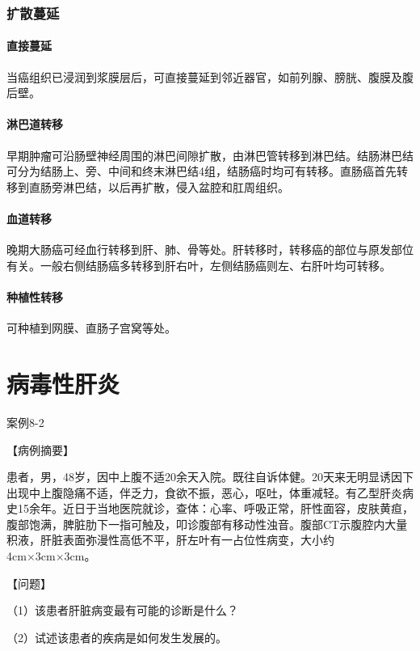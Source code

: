 \subsubsection{扩散蔓延}

\paragraph{直接蔓延}
当癌组织已浸润到浆膜层后，可直接蔓延到邻近器官，如前列腺、膀胱、腹膜及腹后壁。

\paragraph{淋巴道转移}
早期肿瘤可沿肠壁神经周围的淋巴间隙扩散，由淋巴管转移到淋巴结。结肠淋巴结可分为结肠上、旁、中间和终末淋巴结4组，结肠癌时均可有转移。直肠癌首先转移到直肠旁淋巴结，以后再扩散，侵入盆腔和肛周组织。

\paragraph{血道转移}
晚期大肠癌可经血行转移到肝、肺、骨等处。肝转移时，转移癌的部位与原发部位有关。一般右侧结肠癌多转移到肝右叶，左侧结肠癌则左、右肝叶均可转移。

\paragraph{种植性转移}
可种植到网膜、直肠子宫窝等处。

\section{病毒性肝炎}

\begin{framed}
{案例8-2}

{【病例摘要】}

患者，男，48岁，因中上腹不适20余天入院。既往自诉体健。20天来无明显诱因下出现中上腹隐痛不适，伴乏力，食欲不振，恶心，呕吐，体重减轻。有乙型肝炎病史15余年。近日于当地医院就诊，查体：心率、呼吸正常，肝性面容，皮肤黄疸，腹部饱满，脾脏肋下一指可触及，叩诊腹部有移动性浊音。腹部CT示腹腔内大量积液，肝脏表面弥漫性高低不平，肝左叶有一占位性病变，大小约4cm×3cm×3cm。

{【问题】}

（1）该患者肝脏病变最有可能的诊断是什么？

（2）试述该患者的疾病是如何发生发展的。
\end{framed}

